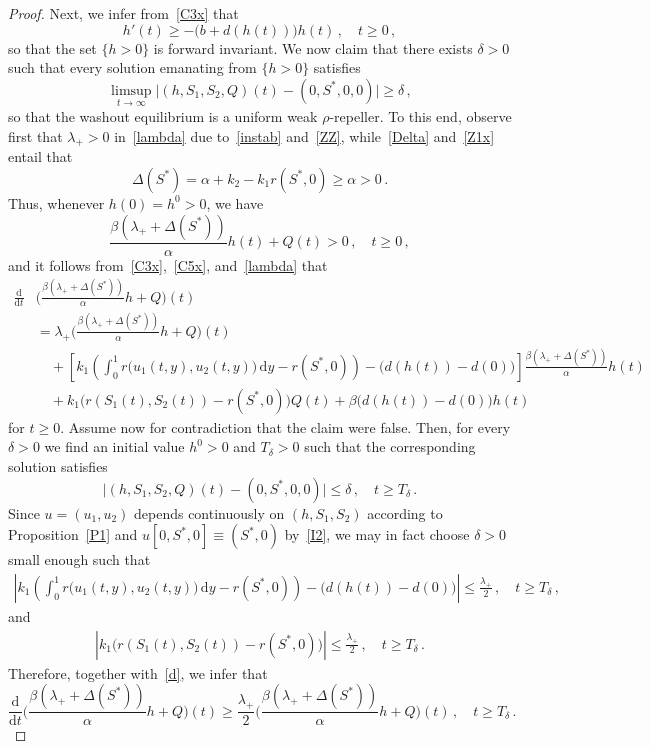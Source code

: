 \documentclass[reqno,11pt]{amsart}
\numberwithin{equation}{section}
\newcommand{\rd}{\mathrm{d}}
\begin{document}
\begin{proof}
Next, we infer from~\eqref{C3x} that 
$$
h'(t)\ge-\big(b+d(h(t))\big)h(t)\,,\quad t\ge 0\,,
$$ 
so that the set $\{h>0\}$ is forward invariant. We now claim that there exists $\delta>0$ such that every solution emanating from $\{h>0\}$ satisfies
\[
\limsup_{t\to\infty}\big|(h,S_1,S_2,Q)(t)-(0,S^*,0,0)\big|\ge\delta\,,
\]
so that the washout equilibrium is a uniform weak $\rho$-repeller. 
To this end, observe first that $\lambda_+>0$ in~\eqref{lambda} due to~\eqref{instab} and~\eqref{ZZ}, while~\eqref{Delta} and~\eqref{Z1x} entail that 
$$
\Delta(S^*)=\alpha+k_2-k_1r(S^*,0)\ge\alpha>0\,.
$$ 
Thus, whenever $h(0)=h^0>0$, we have
\[
\frac{\beta(\lambda_++\Delta(S^*))}{\alpha}h(t)+Q(t)>0\,,\quad t\ge0\,,
\]
and it follows from~\eqref{C3x},~\eqref{C5x}, and~\eqref{lambda} that
\begin{align*}
\frac{\rd}{\rd t}&\bigg(\frac{\beta(\lambda_++\Delta(S^*))}{\alpha}h+Q\bigg)(t)\\
&=\lambda_+\bigg(\frac{\beta(\lambda_++\Delta(S^*))}{\alpha}h+Q\bigg)(t)\\
&\quad +\left[k_1\left(\int_0^1 r\big(u_1(t,y),u_2(t,y)\big)\,\rd y-r(S^*,0)\right)-\big(d(h(t))-d(0)\big)\right]\frac{\beta(\lambda_++\Delta(S^*))}{\alpha}h(t)\\
&\quad+k_1\big(r(S_1(t),S_2(t))-r(S^*,0)\big)Q(t)+\beta\big(d(h(t))-d(0)\big)h(t)
\end{align*}
for $t\ge 0$.
Assume now for contradiction that the claim were false. Then, for every $\delta>0$ we find an initial value $h^0>0$ and $T_\delta>0$ such that the corresponding solution satisfies
\[
\big|(h,S_1,S_2,Q)(t)-(0,S^*,0,0)\big|\le \delta\,,\quad t\ge T_\delta\,.
\]
Since $u=(u_1,u_2)$ depends continuously on $(h,S_1,S_2)$ according to Proposition~\ref{P1} and $u[0,S^*,0]\equiv(S^*,0)$ by~\eqref{I2}, we may in fact choose $\delta>0$ small enough such that
\begin{align*}
\left\vert k_1\left(\int_0^1 r\big(u_1(t,y),u_2(t,y)\big)\,\rd y-r(S^*,0)\right)-\big(d(h(t))-d(0)\big)\right\vert\le \frac{\lambda_+}{2}\,,\quad t\ge T_\delta\,,
\end{align*}
and
\begin{align*}
\left\vert k_1\big(r(S_1(t),S_2(t))-r(S^*,0)\big)\right\vert\le \frac{\lambda_+}{2}\,,\quad t\ge T_\delta\,.
\end{align*}
Therefore, together with~\eqref{d}, we infer that
\begin{equation*}
\frac{\rd}{\rd t}\bigg(\frac{\beta(\lambda_++\Delta(S^*))}{\alpha}h+Q\bigg)(t)\ge\frac{\lambda_+}{2}\bigg(\frac{\beta(\lambda_++\Delta(S^*))}{\alpha}h+Q\bigg)(t)\,,\quad t\ge T_\delta\,.

\end{equation*}
\end{proof}
\end{document}
